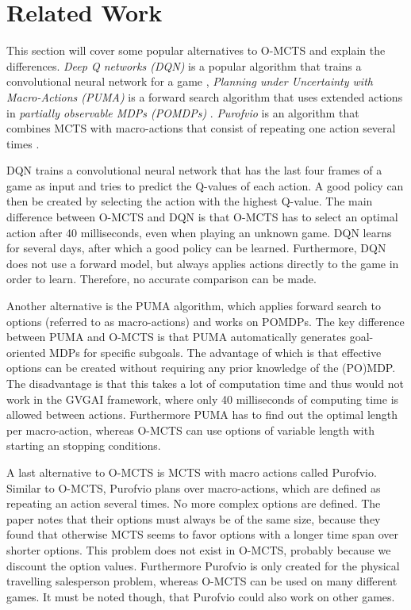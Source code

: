 \section{Related Work}
\label{sec:related}
This section will cover some popular alternatives to O-MCTS and explain the
differences. \emph{Deep Q networks (DQN)} is a popular algorithm that trains a
convolutional neural network for a game \cite{mnih2013playing}, \emph{Planning
under Uncertainty with Macro-Actions (PUMA)} is a forward search algorithm that
uses extended actions in \emph{partially observable MDPs (POMDPs)}
\cite{he2010puma}.  \emph{Purofvio} is an algorithm that combines MCTS with
macro-actions that consist of repeating one action several times
\cite{powley2012monte}.

DQN trains a convolutional neural network that has the last four frames of a
game as input and tries to predict the Q-values of each action. A good policy
can then be created by selecting the action with the highest Q-value. The main
difference between O-MCTS and DQN is that O-MCTS has to select an optimal action
after 40 milliseconds, even when playing an unknown game. DQN learns for several
days, after which a good policy can be learned.  Furthermore, DQN does not use a
forward model, but always applies actions directly to the game in order to
learn.  Therefore, no accurate comparison can be made.

Another alternative is the PUMA algorithm, which applies forward search to
options (referred to as macro-actions) and works on POMDPs. The key difference
between PUMA and O-MCTS is that PUMA automatically generates goal-oriented MDPs
for specific subgoals. The advantage of which is that effective options can be
created without requiring any prior knowledge of the (PO)MDP. The disadvantage
is that this takes a lot of computation time and thus would not work in the
GVGAI framework, where only 40 milliseconds of computing time is allowed between
actions. Furthermore PUMA has to find out the optimal length per macro-action,
whereas O-MCTS can use options of variable length with starting an stopping
conditions.

A last alternative to O-MCTS is MCTS with macro actions called Purofvio.
Similar to O-MCTS, Purofvio plans over macro-actions, which are defined as
repeating an action several times. No more complex options are defined. The
paper notes that their options must always be of the same size, because they
found that otherwise MCTS seems to favor options with a longer time span over
shorter options. This problem does not exist in O-MCTS, probably because we
discount the option values. Furthermore Purofvio is only created for the
physical travelling salesperson problem, whereas O-MCTS can be used on many
different games. It must be noted though, that Purofvio could also work on other
games.
